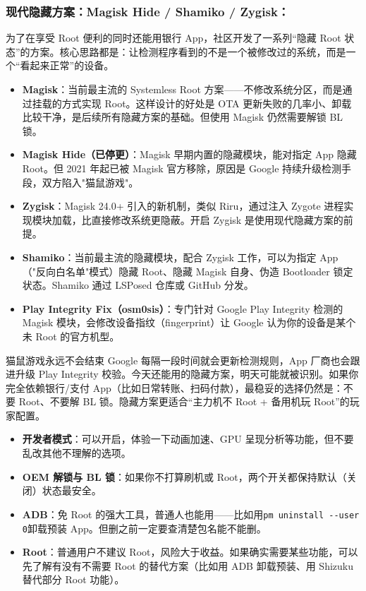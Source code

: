 \subsubsection*{现代隐藏方案：Magisk Hide / Shamiko / Zygisk：}

为了在享受 Root 便利的同时还能用银行 App，社区开发了一系列“隐藏 Root 状态”的方案。核心思路都是：让检测程序看到的不是一个被修改过的系统，而是一个“看起来正常”的设备。

\begin{itemize}
  \item \textbf{Magisk}：当前最主流的 Systemless Root 方案——不修改系统分区，而是通过挂载的方式实现 Root。这样设计的好处是 OTA 更新失败的几率小、卸载比较干净，是后续所有隐藏方案的基础。但使用 Magisk 仍然需要解锁 BL 锁。
  \item \textbf{Magisk Hide（已停更）}：Magisk 早期内置的隐藏模块，能对指定 App 隐藏 Root。但 2021 年起已被 Magisk 官方移除，原因是 Google 持续升级检测手段，双方陷入"猫鼠游戏"。
  \item \textbf{Zygisk}：Magisk 24.0+ 引入的新机制，类似 Riru，通过注入 Zygote 进程实现模块加载，比直接修改系统更隐蔽。开启 Zygisk 是使用现代隐藏方案的前提。
  \item \textbf{Shamiko}：当前最主流的隐藏模块，配合 Zygisk 工作，可以为指定 App（"反向白名单"模式）隐藏 Root、隐藏 Magisk 自身、伪造 Bootloader 锁定状态。Shamiko 通过 LSPosed 仓库或 GitHub 分发。
  \item \textbf{Play Integrity Fix（osm0sis）}：专门针对 Google Play Integrity 检测的 Magisk 模块，会修改设备指纹（fingerprint）让 Google 认为你的设备是某个未 Root 的官方机型。
\end{itemize}

\begin{tcbwarn}{猫鼠游戏永远不会结束}
Google 每隔一段时间就会更新检测规则，App 厂商也会跟进升级 Play Integrity 校验。今天还能用的隐藏方案，明天可能就被识别。如果你完全依赖银行/支付 App（比如日常转账、扫码付款），最稳妥的选择仍然是：不要 Root、不要解 BL 锁。隐藏方案更适合“主力机不 Root + 备用机玩 Root”的玩家配置。

\end{tcbwarn}


\begin{itemize}
  \item \textbf{开发者模式}：可以开启，体验一下动画加速、GPU 呈现分析等功能，但不要乱改其他不理解的选项。
  \item \textbf{OEM 解锁与 BL 锁}：如果你不打算刷机或 Root，两个开关都保持默认（关闭）状态最安全。
  \item \textbf{ADB}：免 Root 的强大工具，普通人也能用——比如用\texttt{pm uninstall -\allowbreak -\allowbreak user 0}卸载预装 App。但删之前一定要查清楚包名能不能删。
  \item \textbf{Root}：普通用户不建议 Root，风险大于收益。如果确实需要某些功能，可以先了解有没有不需要 Root 的替代方案（比如用 ADB 卸载预装、用 Shizuku 替代部分 Root 功能）。
\end{itemize}

